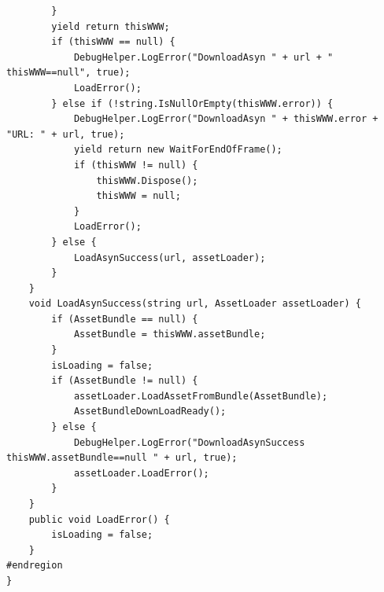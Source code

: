 \documentclass[9pt, b5paper]{article}
\begin{document}
\begin{itemize}
\begin{verbatim}
        }
        yield return thisWWW;
        if (thisWWW == null) {
            DebugHelper.LogError("DownloadAsyn " + url + " thisWWW==null", true);
            LoadError();
        } else if (!string.IsNullOrEmpty(thisWWW.error)) {
            DebugHelper.LogError("DownloadAsyn " + thisWWW.error + "URL: " + url, true);
            yield return new WaitForEndOfFrame();
            if (thisWWW != null) {
                thisWWW.Dispose();
                thisWWW = null;
            }
            LoadError();
        } else {
            LoadAsynSuccess(url, assetLoader);
        }
    }
    void LoadAsynSuccess(string url, AssetLoader assetLoader) {
        if (AssetBundle == null) {
            AssetBundle = thisWWW.assetBundle;
        }
        isLoading = false;
        if (AssetBundle != null) {
            assetLoader.LoadAssetFromBundle(AssetBundle);
            AssetBundleDownLoadReady();
        } else {
            DebugHelper.LogError("DownloadAsynSuccess thisWWW.assetBundle==null " + url, true);
            assetLoader.LoadError();
        }
    }
    public void LoadError() {
        isLoading = false;
    }
#endregion
}
\end{verbatim}
\end{itemize}
\end{document}
